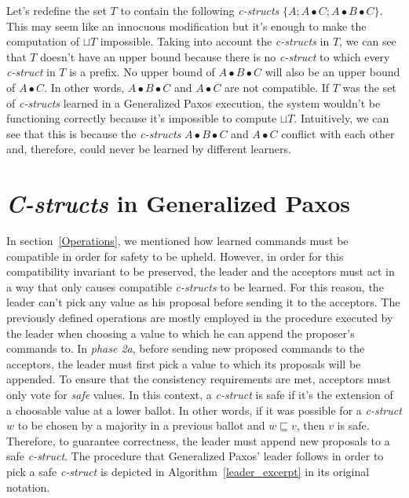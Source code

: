 Let's redefine the set $T$ to contain the following \textit{c-structs} $\{A ; A \bullet C ; A \bullet B \bullet C\}$. This may seem like an innocuous modification but it's enough to make the computation of $\sqcup T$ impossible. Taking into account the \textit{c-structs} in $T$, we can see that $T$ doesn't have an upper bound because there is no \textit{c-struct} to which every \textit{c-struct} in $T$ is a prefix. No upper bound of $A \bullet B \bullet C$ will also be an upper bound of $A \bullet C$. In other words, $A \bullet B \bullet C$ and $A \bullet C$ are not compatible. If $T$ was the set of \textit{c-structs} learned in a Generalized Paxos execution, the system wouldn't be functioning correctly because it's impossible to compute $\sqcup T$. Intuitively, we can see that this is because the \textit{c-structs} $A \bullet B \bullet C$ and $A \bullet C$ conflict with each other and, therefore, could never be learned by different learners. \par 


\section{\textit{C-structs} in Generalized Paxos}
In section~\ref{Operations}, we mentioned how learned commands must be compatible in order for safety to be upheld. However, in order for this compatibility invariant to be preserved, the leader and the acceptors must act in a way that only causes compatible \textit{c-structs} to be learned. For this reason, the leader can't pick any value as his proposal before sending it to the acceptors. The previously defined operations are mostly employed in the procedure executed by the leader when choosing a value to which he can append the proposer's commands to. In \textit{phase 2a}, before sending new proposed commands to the acceptors, the leader must first pick a value to which its proposals will be appended. To ensure that the consistency requirements are met, acceptors must only vote for \textit{safe} values. In this context, a \textit{c-struct} is safe if it's the extension of a choosable value at a lower ballot. In other words, if it was possible for a \textit{c-struct} $w$ to be chosen by a majority in a previous ballot and $w \sqsubseteq v$, then $v$ is safe. Therefore, to guarantee correctness, the leader must append new proposals to a safe \textit{c-struct}. The procedure that Generalized Paxos' leader follows in order to pick a safe \textit{c-struct} is depicted in Algorithm~\ref{leader_excerpt} in its original notation.\par

